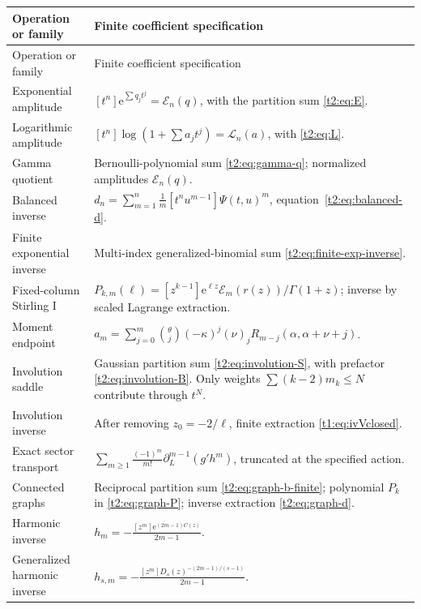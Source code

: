 \documentclass[11pt,openany]{book}
\numberwithin{equation}{chapter}
\theoremstyle{plain}
\theoremstyle{definition}
\theoremstyle{remark}
\newcommand{\ee}{\mathrm e}
\newcommand{\cE}{\mathcal E}\newcommand{\cL}{\mathcal L}
\begin{document}
\begin{longtable}{P{43mm}P{104mm}}
\toprule
Operation or family & Finite coefficient specification\\\midrule
\endfirsthead
\toprule
Operation or family & Finite coefficient specification\\\midrule
\endhead
Exponential amplitude &
$\displaystyle [t^n]\ee^{\sum q_jt^j}=\cE_n(q)$, with the partition sum \eqref{t2:eq:E}.\\[3pt]
Logarithmic amplitude &
$\displaystyle [t^n]\log(1+\sum a_jt^j)=\cL_n(a)$, with \eqref{t2:eq:L}.\\[3pt]
Gamma quotient &
Bernoulli-polynomial sum \eqref{t2:eq:gamma-q}; normalized amplitudes $\cE_n(q)$.\\[3pt]
Balanced inverse &
$\displaystyle d_n=\sum_{m=1}^n\frac1m[t^nu^{m-1}]\Psi(t,u)^m$, equation~\eqref{t2:eq:balanced-d}.\\[3pt]
Finite exponential inverse &
Multi-index generalized-binomial sum \eqref{t2:eq:finite-exp-inverse}.\\[3pt]
Fixed-column Stirling I &
$\displaystyle P_{k,m}(\ell)=[z^{k-1}]\ee^{\ell z}\cE_m(r(z))/\Gamma(1+z)$; inverse by scaled Lagrange extraction.\\[3pt]
Moment endpoint &
$\displaystyle a_m=\sum_{j=0}^m\binom\theta j(-\kappa)^j(\nu)_jR_{m-j}(\alpha,\alpha+\nu+j)$.\\[3pt]
Involution saddle &
Gaussian partition sum \eqref{t2:eq:involution-S}, with prefactor \eqref{t2:eq:involution-B}. Only weights $\sum(k-2)m_k\le N$ contribute through $t^N$.\\[3pt]
Involution inverse &
After removing $z_0=-2/\ell$, finite extraction \eqref{t1:eq:ivVclosed}.\\[3pt]
Exact sector transport &
$\displaystyle \sum_{m\ge1}\frac{(-1)^m}{m!}\partial_L^{m-1}(g'h^m)$, truncated at the specified action.\\[3pt]
Connected graphs &
Reciprocal partition sum \eqref{t2:eq:graph-b-finite}; polynomial $P_k$ in \eqref{t2:eq:graph-P}; inverse extraction \eqref{t2:eq:graph-d}.\\[3pt]
Harmonic inverse &
$\displaystyle h_m=-\frac{[z^m]\ee^{(2m-1)C(z)}}{2m-1}$.\\[3pt]
Generalized harmonic inverse &
$\displaystyle h_{s,m}=-\frac{[z^m]D_s(z)^{-(2m-1)/(s-1)}}{2m-1}$.\\
\bottomrule
\end{longtable}
\end{document}
